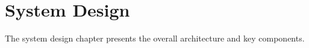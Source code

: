 \section{System Design}

The system design chapter presents the overall architecture and key components.



